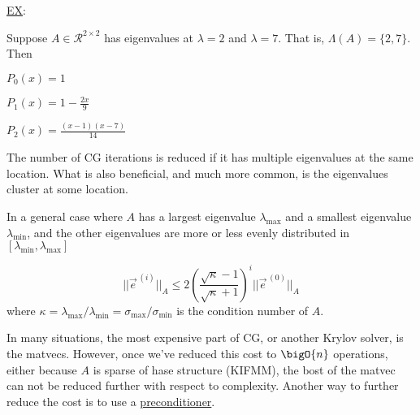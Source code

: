 \underline{EX}:

Suppose $A\in \mathcal{R}^{2\times2}$ has eigenvalues at $\lambda=2$ and $\lambda=7$. That is, $\Lambda(A) = \{ 2, 7 \}$. Then


$P_0(x) = 1$



$P_1(x) = 1 - \frac{2x}{9}$




$P_2(x) = \frac{(x-1)(x-7)}{14}$



The number of CG iterations is reduced if it has multiple eigenvalues at the same location. What is also beneficial, and much more common, is the eigenvalues cluster at some location.

\begin{center}
    
\end{center}

In a general case where $A$ has a largest eigenvalue $\lambda_{\max}$ and a smallest eigenvalue $\lambda_{\min}$, and the other eigenvalues are more or less evenly distributed in $[\lambda_{\min}, \lambda_{\max}]$

\begin{equation*}
    \lvert\lvert \vec{e}^{\,(i)} \rvert\rvert_{A}
    \leq
    2
    \left(
    \frac{\sqrt{\kappa} - 1}{\sqrt{\kappa} + 1}
    \right)^i
    \lvert\lvert \vec{e}^{\,(0)} \rvert\rvert_{A}
\end{equation*}
where $\kappa = \lambda_{\max}/\lambda_{\min} = \sigma_{\max}/\sigma_{\min}$ is the condition number of $A$.

In many situations, the most expensive part of CG, or another Krylov solver, is the matvecs. However, once we've reduced this cost to $\bigO{n}$ operations, either because $A$ is sparse of hase structure (KIFMM), the bost of the matvec can not be reduced further with respect to complexity. Another way to further reduce the cost is to use a \underline{preconditioner}.

